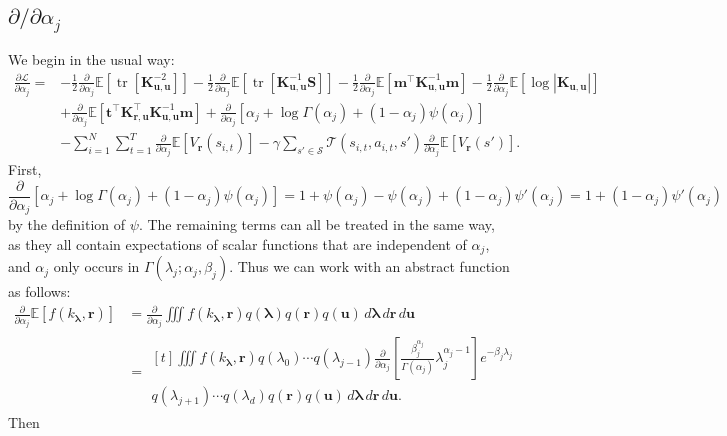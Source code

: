 \documentclass{article}
\theoremstyle{definition}
\theoremstyle{remark}
\DeclareMathOperator{\tr}{tr}
\newcommand{\Kuu}{\mathbf{K}_{\mathbf{u},\mathbf{u}}}
\newcommand{\Kru}{\mathbf{K}_{\mathbf{r},\mathbf{u}}}
\newcommand{\da}{\frac{\partial}{\partial\alpha_j}}
\begin{document}
\subsection{$\partial/\partial\alpha_j$}

We begin in the usual way:
\[
  \begin{split}
    \frac{\partial\mathcal{L}}{\partial\alpha_j} = &-
    \frac{1}{2}\da\mathbb{E}[\tr[\Kuu^{-2}]] - \frac{1}{2}\da\mathbb{E}[\tr[\Kuu^{-1}\mathbf{S}]] - \frac{1}{2}\da\mathbb{E}[\mathbf{m}^\intercal\Kuu^{-1}\mathbf{m}] - \frac{1}{2}\da\mathbb{E}[\log|\Kuu|] \\
    &+ \da\mathbb{E}[\mathbf{t}^\intercal\Kru^\intercal\Kuu^{-1}\mathbf{m}] +
    \da [\alpha_j + \log\Gamma(\alpha_j) + (1 - \alpha_j)\psi(\alpha_j)] \\
      &- \sum_{i=1}^N \sum_{t=1}^T \da\mathbb{E}[V_{\mathbf{r}}(s_{i,t})] -
        \gamma\sum_{s' \in \mathcal{S}} \mathcal{T}(s_{i,t}, a_{i,t},
        s')\da\mathbb{E}[V_{\mathbf{r}}(s')].
  \end{split}
\]
First,
\[ \da [\alpha_j + \log\Gamma(\alpha_j) + (1 - \alpha_j)\psi(\alpha_j)] = 1 +
  \psi(\alpha_j) - \psi(\alpha_j) + (1 - \alpha_j)\psi'(\alpha_j) = 1 + (1 -
  \alpha_j)\psi'(\alpha_j) \]
by the definition of $\psi$. The remaining terms can all be treated in the same
way, as they all contain expectations of scalar functions that are independent
of $\alpha_j$, and $\alpha_j$ only occurs in $\Gamma(\lambda_j; \alpha_j,
\beta_j)$. Thus we can work with an abstract function as follows:
\[
  \begin{split}
    \da\mathbb{E}[f(k_{\bm\lambda}, \mathbf{r})] &= \da \iiint f(k_{\bm\lambda},
    \mathbf{r}) q(\bm\lambda) q(\mathbf{r})
    q(\mathbf{u})\,d\bm\lambda\,d\mathbf{r}\,d\mathbf{u} \\
    &= \begin{multlined}[t]
      \iiint f(k_{\bm\lambda}, \mathbf{r}) q(\lambda_0) \cdots q(\lambda_{j-1}) \da
      \left[ \frac{\beta_j^{\alpha_j}}{\Gamma(\alpha_j)} \lambda_j^{\alpha_j -
          1} \right] e^{-\beta_j\lambda_j} \\
      q(\lambda_{j+1}) \cdots q(\lambda_d) q(\mathbf{r})
      q(\mathbf{u})\,d\bm\lambda\,d\mathbf{r}\,d\mathbf{u}.
    \end{multlined}
  \end{split}
\]
Then
\end{document}
